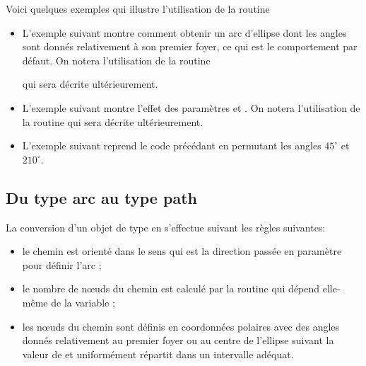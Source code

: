 \documentclass[pdftex]{article}
\begin{document}
Voici quelques exemples qui illustre l'utilisation de la
routine\linebreak {}
\begin{itemize}
\item L'exemple suivant montre comment obtenir un arc d'ellipse dont
  les angles sont donnés relativement à son premier foyer, ce qui est
  le comportement par défaut. On notera l'utilisation de la routine
   qui sera décrite
  ultérieurement.
\item L'exemple suivant montre l'effet des
  paramètres  et . On notera
  l'utilisation de la routine  qui sera décrite
  ultérieurement.
\item L'exemple suivant reprend le code précédant en permutant les angles
  $45^{\circ}$ et $210^{\circ}$.
\end{itemize}

\subsection{\texorpdfstring{Du type \og{}arc\fg{} au type
    \og{}path\fg{}}{Du type «arc» au type «path»}}
La conversion d'un objet  de type  en 
s'effectue suivant les règles suivantes:
\begin{itemize}
\item le chemin est orienté dans le sens  qui est
  la direction passée en paramètre pour définir l'arc ;
\item le nombre de n\oe{}uds du chemin est calculé par la routine
  \linebreak{}%
  qui dépend elle-même de la variable\linebreak
  ;
\item les n\oe{}uds du chemin sont définis en coordonnées polaires
  avec des angles donnés relativement au premier foyer ou au centre de
  l'ellipse suivant la valeur de  et
  uniformément répartit dans un intervalle adéquat.
\end{itemize}
\end{document}
